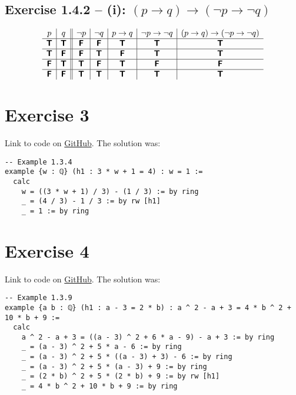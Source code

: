 \documentclass[11pt]{article}
\newcommand{\TTT}{\bm{\mathsf{T}}}
\newcommand{\FFF}{\bm{\mathsf{F}}}
\begin{document}
\subsection*{Exercise 1.4.2 -- (i): $(p \to q) \to (\neg{p} \to \neg{q})$}
\[
\begin{array}{ c | c || c | c | c | c | c}
 p & q & \neg{p} & \neg{q}& p \to q & \neg{p} \to \neg{q} & (p \to q) \to (\neg{p} \to \neg{q})
\\ \hline 
 \TTT & \TTT & \FFF & \FFF & \TTT & \TTT & \TTT \\ \hline  
 \TTT & \FFF & \FFF & \TTT & \FFF & \TTT & \TTT \\ \hline  
 \FFF & \TTT & \TTT & \FFF & \TTT & \FFF & \FFF \\ \hline  
 \FFF & \FFF & \TTT & \TTT & \TTT & \TTT & \TTT
\end{array}
\]

\section*{Exercise 3}
Link to code on \href{https://github.com/lucastassis/BU-CS511/blob/main/HW01/code/HW01.lean}{GitHub}. The solution was:

\begin{lstlisting}
-- Example 1.3.4
example {w : ℚ} (h1 : 3 * w + 1 = 4) : w = 1 :=
  calc
    w = ((3 * w + 1) / 3) - (1 / 3) := by ring
    _ = (4 / 3) - 1 / 3 := by rw [h1]
    _ = 1 := by ring
\end{lstlisting}

\section*{Exercise 4}
Link to code on \href{https://github.com/lucastassis/BU-CS511/blob/main/HW01/code/HW01.lean}{GitHub}. The solution was: 

\begin{lstlisting}
-- Example 1.3.9
example {a b : ℚ} (h1 : a - 3 = 2 * b) : a ^ 2 - a + 3 = 4 * b ^ 2 + 10 * b + 9 :=
  calc
    a ^ 2 - a + 3 = ((a - 3) ^ 2 + 6 * a - 9) - a + 3 := by ring
    _ = (a - 3) ^ 2 + 5 * a - 6 := by ring
    _ = (a - 3) ^ 2 + 5 * ((a - 3) + 3) - 6 := by ring
    _ = (a - 3) ^ 2 + 5 * (a - 3) + 9 := by ring
    _ = (2 * b) ^ 2 + 5 * (2 * b) + 9 := by rw [h1]
    _ = 4 * b ^ 2 + 10 * b + 9 := by ring
\end{lstlisting}
\end{document}
